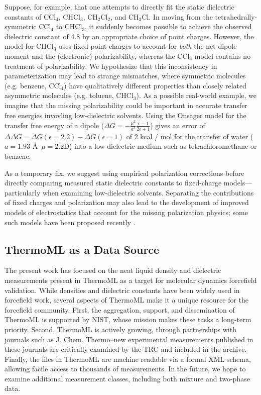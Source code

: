 \documentclass[aps,pre,twocolumn,nofootinbib,superscriptaddress,linenumbers]{revtex4-1}
\begin{document}
Suppose, for example, that one attempts to directly fit the static dielectric constants of $\mathrm{CCl_4}$, $\mathrm{CHCl_3}$, $\mathrm{CH_2Cl_2}$, and $\mathrm{CH_3Cl}$.
In moving from the tetrahedrally-symmetric $\mathrm{CCl_4}$ to $\mathrm{CHCl_3}$, it suddenly becomes possible to achieve the observed dielectric constant of 4.8 by an appropriate choice of point charges.
However, the model for $\mathrm{CHCl_3}$ uses fixed point charges to account for \emph{both} the net dipole moment and the (electronic) polarizability, whereas the $\mathrm{CCl_4}$ model contains no treatment of polarizability.  
We hypothesize that this inconsistency in parameterization may lead to strange mismatches, where symmetric molecules (e.g. benzene, $\mathrm{CCl_4}$) have qualitatively different properties than closely related asymmetric molecules (e.g. toluene, $\mathrm{CHCl_3}$).
As a possible real-world example, we imagine that the missing polarizability could be important in accurate transfer free energies invovling low-dielectric solvents.  
Using the Onsager model for the transfer free energy of a dipole ($\Delta G = -\frac{\mu^2}{a^3}\frac{\epsilon - 1}{2 \epsilon + 1}$) gives an error of $\Delta \Delta G = \Delta G(\epsilon=2.2) - \Delta G(\epsilon=1)$ of 2 kcal / mol for the transfer of water ($a = 1.93$ \AA\, $\mu = 2.2$D) into a low dielectric medium such as tetrachloromethane or benzene.  

As a temporary fix, we suggest using empirical polarization corrections before directly comparing measured static dielectric constants to fixed-charge models---particularly when examining low-dielectric solvents.  
Separating the contributions of fixed charges and polarization may also lead to the development of improved models of electrostatics that account for the missing polarization physics; some such models have been proposed recently \cite{leontyev2014polarizable, truchon2010using, truchon2009integrated}.


\subsection{ThermoML as a Data Source}

The present work has focused on the neat liquid density and dielectric measurements present in ThermoML \cite{frenkel2006xml, frenkel2003thermoml, chirico2003thermoml} as a target for molecular dynamics forcefield validation.  
While densities and dielectric constants have been widely used in forcefield work, several aspects of ThermoML make it a unique resource for the forcefield community.  
First, the aggregation, support, and dissemination of ThermoML is supported by NIST, whose mission makes these tasks a long-term priority.  
Second, ThermoML is actively growing, through partnerships with journals such as J. Chem. Thermo--new experimental measurements published in these journals are critically examined by the TRC and included in the archive.  
Finally, the files in ThermoML are machine readable via a formal XML schema, allowing facile access to thousands of measurements.  
In the future, we hope to examine additional measurement classes, including both mixture and two-phase data.
\end{document}

